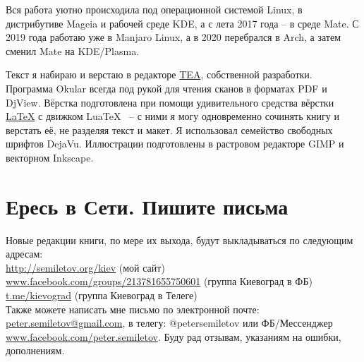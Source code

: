 Вся работа уютно происходила под операционной системой Linux, в дистрибутиве Mageia и рабочей среде KDE, а с лета 2017 года – в среде Mate. С 2019 года работаю уже в Manjaro Linux, а в 2020 перебрался в Arch, а затем сменил Mate на KDE/Plasma. 

Текст я набираю и верстаю в редакторе \href{http://semiletov.org/tea}{TEA}, собственной разработки. Программа Okular всегда под рукой для чтения сканов в форматах PDF и DjView. Вёрстка подготовлена при помощи удивительного средства вёрстки \href{http://www.latex-project.org/}{\LaTeX} с движком Lua\TeX~ – с ними я могу одновременно сочинять книгу и верстать её, не разделяя текст и макет. Я использовал семейство свободных шрифтов DejaVu. Иллюстрации подготовлены в растровом редакторе GIMP и векторном Inkscape.




\section*{Ересь в Сети. Пишите письма}

Новые редакции книги, по мере их выхода, будут выкладываться по следующим адресам:\\ 

\noindent
\href{http://semiletov.org/kiev}{http://semiletov.org/kiev} (мой сайт)\\
\href{https://www.facebook.com/groups/213781655750601/}{www.facebook.com/groups/213781655750601} (группа Киевоград в ФБ)\\
\href{https://t.me/kievograd}{t.me/kievograd} (группа Киевоград в Телеге)\\

Также можете написать мне письмо по электронной почте: \href{peter.semiletov@gmail.com}{peter.semiletov@gmail.com}, 
в телегу: @petersemiletov или ФБ/Мессенджер \href{https://www.facebook.com/peter.semiletov}{www.facebook.com/peter.semiletov}. Буду рад отзывам, указаниям на ошибки, дополнениям.
